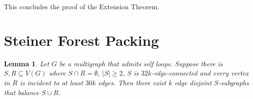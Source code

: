 \documentclass{article}
\newtheorem{lemma}{Lemma}[section]
\begin{document}


This concludes the proof of the Extension Theorem. 

\section{Steiner Forest Packing}
\begin{lemma}\label{lem:basecase}
    Let $G$ be a multigraph that admits self loops. Suppose there is $S,R \subseteq V(G)$ where $S \cap R = \emptyset$, $|S| \geq 2$, $S$ is $32k$-edge-connected and every vertex in $R$ is incident to at least $30k$ edges. Then there exist $k$ edge disjoint $S$-subgraphs that balance $S \cup R$. 
\end{lemma}
\end{document}
